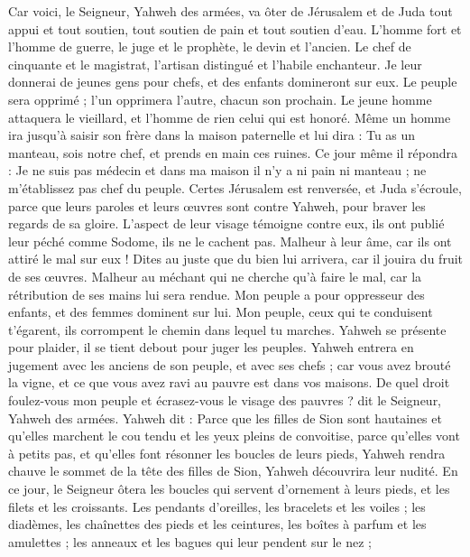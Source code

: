 \begin{multicols}{2}
\VerseOne{}Car voici, le Seigneur, Yahweh des armées, va ôter de Jérusalem et de Juda tout appui et tout soutien, tout soutien de pain et tout soutien d'eau.
L'homme fort et l'homme de guerre, le juge et le prophète, le devin et l'ancien.
Le chef de cinquante et le magistrat, l’artisan distingué et l’habile enchanteur.
Je leur donnerai de jeunes gens pour chefs, et des enfants domineront sur eux.
Le peuple sera opprimé ; l’un opprimera l'autre, chacun son prochain. Le jeune homme attaquera le vieillard, et l'homme de rien celui qui est honoré.
Même un homme ira jusqu’à saisir son frère dans la maison paternelle et lui dira : Tu as un manteau, sois notre chef, et prends en main ces ruines.
Ce jour même il répondra : Je ne suis pas médecin et dans ma maison il n'y a ni pain ni manteau ; ne m’établissez pas chef du peuple.
Certes Jérusalem est renversée, et Juda s’écroule, parce que leurs paroles et leurs œuvres sont contre Yahweh, pour braver les regards de sa gloire.
L’aspect de leur visage témoigne contre eux, ils ont publié leur péché comme Sodome, ils ne le cachent pas. Malheur à leur âme, car ils ont attiré le mal sur eux !
Dites au juste que du bien lui arrivera, car il jouira du fruit de ses œuvres.
Malheur au méchant qui ne cherche qu'à faire le mal, car la rétribution de ses mains lui sera rendue.
Mon peuple a pour oppresseur des enfants, et des femmes dominent sur lui. Mon peuple, ceux qui te conduisent t’égarent, ils corrompent le chemin dans lequel tu marches.
Yahweh se présente pour plaider, il se tient debout pour juger les peuples.
Yahweh entrera en jugement avec les anciens de son peuple, et avec ses chefs ; car vous avez brouté la vigne, et ce que vous avez ravi au pauvre est dans vos maisons.
De quel droit foulez-vous mon peuple et écrasez-vous le visage des pauvres ? dit le Seigneur, Yahweh des armées.
Yahweh dit : Parce que les filles de Sion sont hautaines et qu’elles marchent le cou tendu et les yeux pleins de convoitise, parce qu’elles vont à petits pas, et qu’elles font résonner les boucles de leurs pieds,
Yahweh rendra chauve le sommet de la tête des filles de Sion, Yahweh découvrira leur nudité.
En ce jour, le Seigneur ôtera les boucles qui servent d’ornement à leurs pieds, et les filets et les croissants.
Les pendants d’oreilles, les bracelets et les voiles ;
les diadèmes, les chaînettes des pieds et les ceintures, les boîtes à parfum et les amulettes ;
les anneaux et les bagues qui leur pendent sur le nez ;

\end{multicols}
